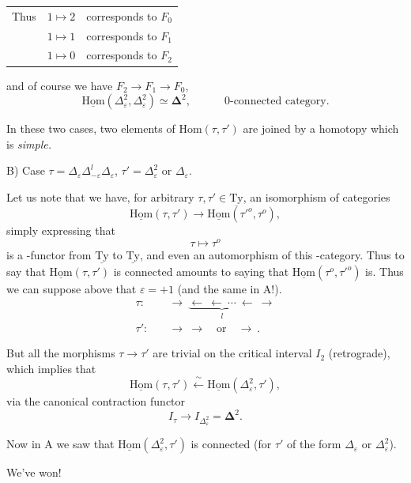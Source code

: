 \documentclass[11pt]{article}
\newcommand{\printedpage}[1]{\marginpar{\footnotesize p.~#1}}
\newcommand{\msp}[1]{\marginpar{\footnotesize [#1]}}
\newcommand{\uHom}{\underline{\mathrm{Hom}}}
\newcommand{\uTy}{\underline{\mathrm{Ty}}}
\begin{document}
\printedpage{59}

\begin{tabular}{lll}
Thus & $1\longmapsto 2$ & corresponds to \quad $F_0$\\[1ex]
 & $1\longmapsto 1$ & corresponds to \quad $F_1$\\[1ex]
 & $1\longmapsto 0$ & corresponds to \quad $F_2$
\end{tabular}

and of course we have $F_2\longrightarrow F_1\longrightarrow F_0$, %
\[
\uHom(\Delta^2_\varepsilon,\Delta^2_\varepsilon)\simeq\boldsymbol{\Delta}^2,\qquad\quad\text{0-connected category.}
\]

In these two cases, two elements of $\mathrm{Hom}(\tau,\tau')$ are joined by a homotopy which is \textit{simple.}

\msp{page 93}

B) Case $\tau=\Delta_\varepsilon\Delta^l_{-\varepsilon}\Delta_\varepsilon$, $\tau'=\Delta^2_\varepsilon$ or $\Delta_\varepsilon$.

Let us note that we have, for arbitrary $\tau,\tau'\in\uTy$, an isomorphism of categories
\[
\uHom(\tau,\tau')\longrightarrow\uHom(\tau'^o,\tau^o),
\]
simply expressing that
\[
\tau\longmapsto\tau^o
\]
is a -functor from $\uTy$ to $\uTy$, and even an automorphism of this -category. Thus to say that $\uHom(\tau,\tau')$ is connected amounts to saying that $\uHom(\tau^o,\tau'^o)$ is. Thus we can suppose above that $\varepsilon=+1$ (and the same in A!).
\[
\begin{aligned}
\tau :\quad & \longrightarrow\ \underbrace{\longleftarrow\ \longleftarrow\ \cdots\ \longleftarrow}_{l}\ \longrightarrow\\
\tau' :\quad & \longrightarrow\ \longrightarrow\quad\text{or}\quad\longrightarrow\ .
\end{aligned}
\]

But all the morphisms $\tau\longrightarrow\tau'$ are trivial on the critical interval $I_2$ (retrograde), which implies that
\[
\uHom(\tau,\tau')\xleftarrow{\ \sim\ }\uHom(\Delta^2_\varepsilon,\tau'),
\]
via the canonical contraction functor
\[
I_\tau\longrightarrow I_{\Delta^2_\varepsilon}=\boldsymbol{\Delta}^2.
\]

Now in A we saw that $\uHom(\Delta^2_\varepsilon,\tau')$ is connected (for $\tau'$ of the form $\Delta_\varepsilon$ or $\Delta^2_\varepsilon$).

We've won!

\newpage
\printedpage{60}
\end{document}
